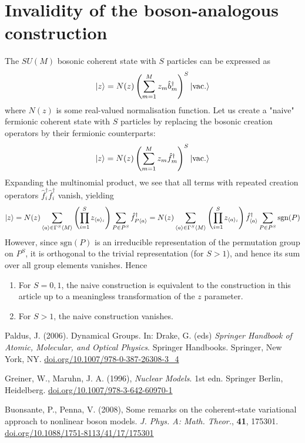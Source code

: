 \documentclass[12pt]{article}
\newcommand{\sgn}{\text{sgn}}
\newcommand{\seq}[1]{\langle #1\rangle}
\newcommand{\hc}{^\dagger}
\begin{document}
	\section{Invalidity of the boson-analogous construction}
	
	The $SU(M)$ bosonic coherent state with $S$ particles can be expressed as
	\begin{equation}
	\ket{z}=N(z)\left(\sum_{m=1}^Mz_m\hat{b}\hc_m\right)^S\ket{\text{vac.}}
	\end{equation}
	where $N(z)$ is some real-valued normalisation function. Let us create a "naive" fermionic coherent state with $S$ particles by replacing the bosonic creation operators by their fermionic counterparts:
	\begin{equation}
	\ket{z}=N(z)\left(\sum_{m=1}^Mz_m\hat{f}\hc_m\right)^S\ket{\text{vac.}}
	\end{equation}
	Expanding the multinomial product, we see that all terms with repeated creation operators $\hat{f}\hc_i\hat{f}\hc_i$ vanish, yielding
	\begin{equation*}
	\ket{z}=N(z)\sum_{\seq{a}\in\Gamma^S\seq{M}} \left(\prod_{i=1}^S z_{\seq{a}_i}\right) \sum_{P\in P^S} \hat{f}\hc_{P\seq{a}}=N(z)\sum_{\seq{a}\in\Gamma^S\seq{M}} \left(\prod_{i=1}^S z_{\seq{a}_i}\right) \hat{f}\hc_{\seq{a}}\sum_{P\in P^S}\sgn(P)
	\end{equation*}
	However, since $\sgn(P)$ is an irreducible representation of the permutation group on $P^S$, it is orthogonal to the trivial representation (for $S>1$), and hence its sum over all group elements vanishes. Hence
	\begin{enumerate}
		\item For $S=0,1$, the naive construction is equivalent to the construction in this article up to a meaningless transformation of the $z$ parameter.
		\item For $S>1$, the naive construction vanishes.
	\end{enumerate}
	
	\begin{thebibliography}{10}
	
	Paldus, J. (2006). Dynamical Groups. In: Drake, G. (eds) \textit{Springer Handbook of Atomic, Molecular, and Optical Physics}. Springer Handbooks. Springer, New York, NY. \href{https://doi.org/10.1007/978-0-387-26308-3\_4}{doi.org/10.1007/978-0-387-26308-3\_4}
	
	Greiner, W., Maruhn, J. A. (1996), \textit{Nuclear Models}. 1st edn. Springer Berlin, Heidelberg. \href{https://doi.org/10.1007/978-3-642-60970-1}{doi.org/10.1007/978-3-642-60970-1}
	
	Buonsante, P., Penna, V. (2008), Some remarks on the coherent-state variational approach to nonlinear boson models. \textit{J. Phys. A: Math. Theor.}, \textbf{41}, 175301. \href{https://doi.org/10.1088/1751-8113/41/17/175301}{doi.org/10.1088/1751-8113/41/17/175301}

	\end{thebibliography}	
	
\end{document}
